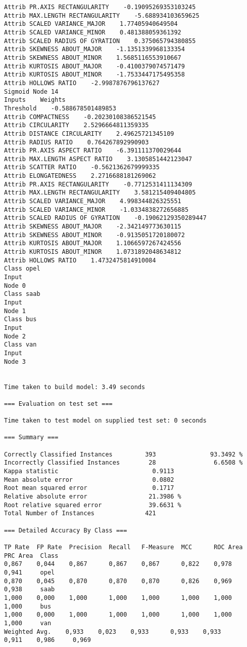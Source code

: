\documentclass[
	article,			%
	11pt,				%
	oneside,			%
	a4paper,			%
	english,			%
	brazil,				%
	sumario=tradicional
	]{abntex2}
\begin{document}
\begin{lstlisting}
Attrib PR.AXIS RECTANGULARITY    -0.19095269353103245
Attrib MAX.LENGTH RECTANGULARITY    -5.688934103659625
Attrib SCALED VARIANCE_MAJOR    1.77405940649504
Attrib SCALED VARIANCE_MINOR    0.481388059361392
Attrib SCALED RADIUS OF GYRATION    0.375065794380855
Attrib SKEWNESS ABOUT_MAJOR    -1.1351339968133354
Attrib SKEWNESS ABOUT_MINOR    1.5685116553910667
Attrib KURTOSIS ABOUT_MAJOR    -0.4100379074571479
Attrib KURTOSIS ABOUT_MINOR    -1.7533447175495358
Attrib HOLLOWS RATIO    -2.9987876796137627
Sigmoid Node 14
Inputs    Weights
Threshold    -0.588678501489853
Attrib COMPACTNESS    -0.20230108386521545
Attrib CIRCULARITY    2.5296664811359335
Attrib DISTANCE CIRCULARITY    2.49625721345109
Attrib RADIUS RATIO    0.764267892990903
Attrib PR.AXIS ASPECT RATIO    -6.391111370029644
Attrib MAX.LENGTH ASPECT RATIO    3.1305851442123047
Attrib SCATTER RATIO    -0.5621362679999335
Attrib ELONGATEDNESS    2.2716688181269062
Attrib PR.AXIS RECTANGULARITY    -0.7712531411134309
Attrib MAX.LENGTH RECTANGULARITY    3.581215409404805
Attrib SCALED VARIANCE_MAJOR    4.998344826325551
Attrib SCALED VARIANCE_MINOR    -1.0334838272656885
Attrib SCALED RADIUS OF GYRATION    -0.19062129350289447
Attrib SKEWNESS ABOUT_MAJOR    -2.342149773630115
Attrib SKEWNESS ABOUT_MINOR    -0.9135051720180072
Attrib KURTOSIS ABOUT_MAJOR    1.1066597267424556
Attrib KURTOSIS ABOUT_MINOR    1.0731892048634812
Attrib HOLLOWS RATIO    1.4732475814910084
Class opel
Input
Node 0
Class saab
Input
Node 1
Class bus
Input
Node 2
Class van
Input
Node 3


Time taken to build model: 3.49 seconds

=== Evaluation on test set ===

Time taken to test model on supplied test set: 0 seconds

=== Summary ===

Correctly Classified Instances         393               93.3492 %
Incorrectly Classified Instances        28                6.6508 %
Kappa statistic                          0.9113
Mean absolute error                      0.0802
Root mean squared error                  0.1717
Relative absolute error                 21.3986 %
Root relative squared error             39.6631 %
Total Number of Instances              421     

=== Detailed Accuracy By Class ===

TP Rate  FP Rate  Precision  Recall   F-Measure  MCC      ROC Area  PRC Area  Class
0,867    0,044    0,867      0,867    0,867      0,822    0,978     0,941     opel
0,870    0,045    0,870      0,870    0,870      0,826    0,969     0,938     saab
1,000    0,000    1,000      1,000    1,000      1,000    1,000     1,000     bus
1,000    0,000    1,000      1,000    1,000      1,000    1,000     1,000     van
Weighted Avg.    0,933    0,023    0,933      0,933    0,933      0,911    0,986     0,969     


\end{lstlisting}
\end{document}
